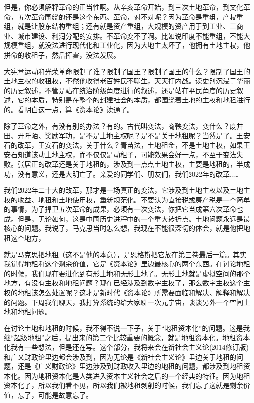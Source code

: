 \documentclass[UTF8, 12pt, a4paper]{ctexrep}
\begin{document}
但是，你必须解释革命的正当性啊。从辛亥革命开始，到三次土地革命，到文化革命，五次革命围绕的还是这个东西。革命，对不对呢？因为革命是重组，产权重组，就是让股东结构重组；还有就是资产重组，大规模的资产用于到工业、工商业、城市建设、利润分配的安排。不革命变不了啊。比如说印度不能重组，不能大规模重组，就没法进行现代化和工业化，因为大地主太坏了，他拥有土地主权，他拼命的收租子，然后挥霍，没法发展。

大宪章运动和光荣革命限制了谁？限制了国王？限制了国王的什么？限制了国王的土地主权的收租权，不然他收得老百姓民不聊生，天天打内战。读史别沉浸于华丽的历史叙述，不管是站在统治阶级角度进行的叙述，还是站在平民角度的历史叙述，它的本质，特别是在整个的封建社会的本质，都围绕着土地的主权和地租进行的。看明白这一点，算《资本论》读通了。

除了革命之外，有没有别的办法？有的。古代叫变法，商鞅变法，变什么？废井田、开阡陌、奖励军功，是不是土地主权呢？是不是关于地租呢？当然是了。王安石的改革，王安石的变法，关于什么？青苗法，土地租金，不是土地主权，如果王安石知道该动土地主权，而不仅仅是动租子，可能效果会好一点，不至于变法失败。张居正的改革还是关于地租的，涉及到一点点土地主权，主要是地租的，半成功，没有意义，还是大明亡了。亲爱的同学们、朋友们，我们2022年的改革……

我们2022年二十大的改革，那才是一场真正的变法，它涉及到土地主权以及土地主权的收益、地租和土地使用权，重新规范化。不要认为直接税或房产税是一个简单的事情，为了捍卫五次革命的成果，必须有一次变法，你把它当成第六次革命也成。但是，无论如何，这是中国历史进程中的一个重大转折点。土地问题永远是最核心的问题。我说了，马克思当时怎么想，我现在不能很深切的体会，就是他把地租这个地方，

就是马克思把地租（这不是他的本意），是恩格斯把它放在第三卷最后一篇。其实我觉得地租和这个剩余价值，它是《资本论》里边最核心的两个东西。在讨论地租的时候，我们现在要进化到有形土地和无形土地了。无形土地就是虚拟空间的那个地方，有没有主权和地租问题？现在已经涉及到数字主权了，那么数字主权这个主权的地租该怎么处置呢？这才是新时代《资本论》所需要面临和解决、解释和解决的问题。下周我们聊天，我打算系统的给大家聊一次元宇宙，谈谈另外一个空间土地和地租问题。

在讨论土地和地租的时候，我不得不说一下子，关于“地租资本化”的问题。这是我继“超级地租”之后，提出来的第二个比较重要的概念，就是地租资本化。地租资本化我有一些想法，但是还在写。这个部分，我将来会在新社会主义论(2014修订版)和广义财政论里边都会涉及到，因为无论是《新社会主义论》里边关于地租的问题，还是《广义财政论》里边涉及到财政收入里边的地租的问题，都涉及到地租资本化。因为地租资本化是人类进入资本主义社会之后的一个经典的特征。因为地租资本化了，所以我们看不见，所以我们被地租剥削的时候，我们忘了这就是剩余价值，忘了，可能是故意忘了。
\end{document}
